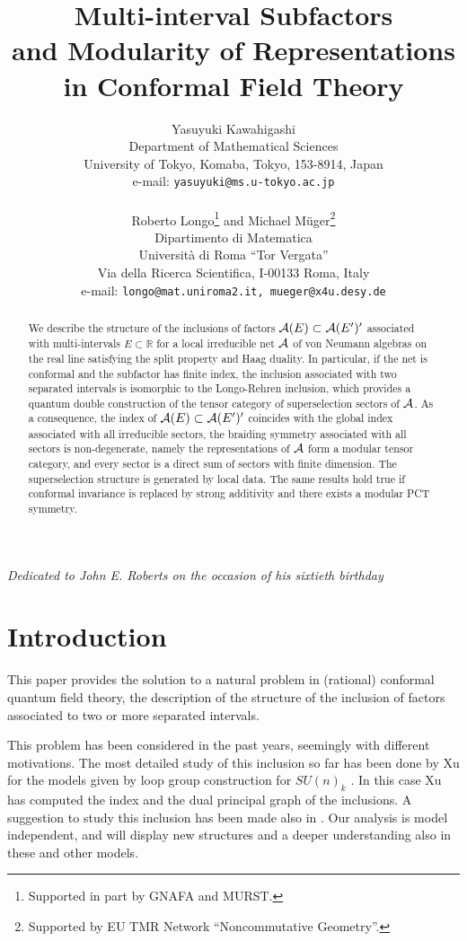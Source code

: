 \documentclass[12pt]{article}
\title{{\bf
Multi-interval Subfactors \\
and Modularity of Representations\\
in Conformal Field Theory}}
\author{
{\sc Yasuyuki Kawahigashi}\\
Department of Mathematical Sciences\\
University of Tokyo, Komaba, Tokyo, 153-8914, Japan\\
e-mail: {\tt yasuyuki@ms.u-tokyo.ac.jp}\\
\vphantom{X}\\
{\sc Roberto Longo}\footnote{Supported in part by GNAFA and
MURST.} \phantom{i}and
{\sc Michael M\"uger}\footnote{Supported by EU TMR Network
``Noncommutative Geometry''.}\\
Dipartimento di Matematica\\
Universit\`a di Roma ``Tor Vergata''\\
Via della Ricerca Scientifica, I-00133 Roma, Italy\\
e-mail: {\tt longo@mat.uniroma2.it, mueger@x4u.desy.de}}
\def\A{{\cal A}}
\def\R{{\mathbb R}}
\begin{document}
\date{}
\maketitle
\centerline{\sl Dedicated to John E. Roberts on the occasion of his
sixtieth birthday}
\bigskip

\begin{abstract}
We describe the structure of the inclusions of factors $\A(E)\subset
\A(E')'$
associated with multi-intervals $E\subset\R$ for a local
irreducible net $\A$ of von Neumann algebras on the real line satisfying
the split property and Haag duality.
In particular, if the net is conformal and the subfactor has finite
index,
the inclusion associated with
two separated intervals is isomorphic to
the Longo-Rehren inclusion, which provides a
quantum double construction of the tensor category of superselection
sectors of $\A$. As a consequence,  the index of  $\A(E)\subset
\A(E')'$
coincides with the global index associated with all irreducible
sectors, the braiding symmetry associated with all sectors is
non-degenerate, namely the representations of $\A$
form a modular tensor category, and every
sector is a direct sum of sectors with finite dimension.
The superselection structure is generated by local data.
The same results hold true if conformal invariance is
replaced by strong additivity
and there exists a modular PCT symmetry.
\end{abstract}
\newpage

\section{Introduction}

This paper provides the solution to a natural problem in (rational)
conformal quantum field theory, the description of the structure of the
inclusion of factors associated to two or more separated intervals.

This problem has been considered in the past years, seemingly with different
motivations. The most detailed study of this inclusion so far has been done by Xu
\cite{X2} for the models given by loop group construction for $SU(n)_k$ \cite{W}.
In this case Xu has computed the index and the dual principal graph of the inclusions. 
A suggestion to study this inclusion has been made also in \cite[Section 3]{S}.
Our analysis is model independent, and will display new structures and a deeper
understanding also in these and other models.
\end{document}
